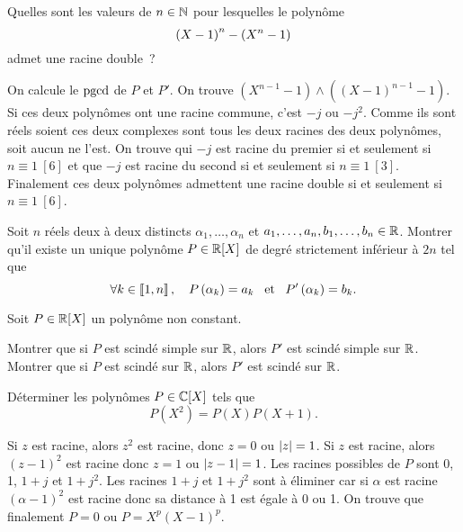 \documentclass{magnolia}
\begin{document}
Quelles sont les valeurs de $n\in\mathbb{N}$ pour lesquelles le polynôme
\[\left(X-1\right)^n-\left(X^n-1\right)\]
admet une racine double~?
\begin{sol}
On calcule le $\operatorname{pgcd}$ de $P$ et $P'$. On trouve
$(X^{n-1}-1)\wedge((X-1)^{n-1}-1)$. Si ces deux polynômes ont une racine commune,
c'est $-j$ ou $-j^2$. Comme ils sont réels soient ces deux complexes sont tous
les deux racines des deux polynômes, soit aucun ne l'est. On trouve
qui $-j$ est racine du premier si et seulement si $n\equiv 1\ [6]$ et que
$-j$ est racine du second si et seulement si $n\equiv 1\ [3]$. Finalement
ces deux polynômes admettent une racine double si et seulement si
$n\equiv 1\ [6]$.
\end{sol}

Soit $n$ réels deux à deux distincts $\alpha_1,\ldots,\alpha_n$ et
$a_1,\ldots,a_n,b_1,\ldots,b_n\in\mathbb{R}$. Montrer qu'il existe un unique polynôme
$P\in\polyR$ de degré strictement inférieur à $2n$ tel que
\[\forall k\in\left\llbracket 1,n\right\rrbracket ,\quad P\left(\alpha_k\right)=a_k \quad\!\text{et}\quad\! P'\left(\alpha_k\right)=b_k.\]

Soit $P\in\polyR$ un polynôme non constant.
\begin{questions}
\question Montrer que si $P$ est scindé simple sur $\mathbb{R}$, alors $P'$ est scindé simple sur $\mathbb{R}$.
\question Montrer que si $P$ est scindé sur $\mathbb{R}$, alors $P'$ est scindé sur $\mathbb{R}$.
\end{questions}

Déterminer les polynômes $P\in\polyC$ tels que
\[P(X^2)=P(X)P(X+1).\]
\begin{sol}
Si $z$ est racine, alors $z^2$ est racine, donc $z=0$ ou $\left|z\right|=1$. Si
$z$ est racine, alors $(z-1)^2$ est racine donc $z=1$ ou $\left|z-1\right|=1$.
Les racines possibles de $P$ sont 0, 1, $1+j$ et $1+j^2$. Les racines
$1+j$ et $1+j^2$ sont à éliminer car si $\alpha$ est racine $(\alpha-1)^2$
est racine donc sa distance à 1 est égale à 0 ou 1. On trouve que finalement
$P=0$ ou $P=X^p(X-1)^p$.
\end{sol}

\end{document}
